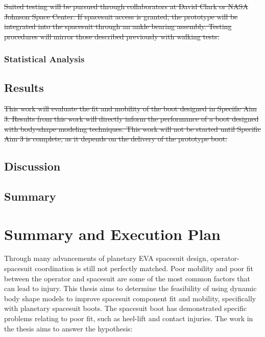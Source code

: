 \documentclass[defaultstyle,11pt]{comps}
\providecommand{\DIFdeltex}[1]{{\protect\color{red}\sout{#1}}}                      %
\providecommand{\DIFaddbegin}{} %
\providecommand{\DIFaddend}{} %
\providecommand{\DIFdelbegin}{} %
\providecommand{\DIFdelend}{} %
\providecommand{\DIFdel}[1]{\texorpdfstring{\DIFdeltex{#1}}{}} %
\newcommand{\DIFscaledelfig}{0.5}
\newlength{\DIFdelgraphicswidth} %
\newlength{\DIFdelgraphicsheight} %
\newcommand{\DIFaddincludegraphics}[2][]{{\color{blue}\fbox{\DIFOincludegraphics[#1]{#2}}}} %
\newcommand{\DIFdelincludegraphics}[2][]{%
\sbox{\DIFdelgraphicsbox}{\DIFOincludegraphics[#1]{#2}}%
\settoboxwidth{\DIFdelgraphicswidth}{\DIFdelgraphicsbox} %
\settoboxtotalheight{\DIFdelgraphicsheight}{\DIFdelgraphicsbox} %
\scalebox{\DIFscaledelfig}{%
\parbox[b]{\DIFdelgraphicswidth}{\usebox{\DIFdelgraphicsbox}\\[-\baselineskip] \rule{\DIFdelgraphicswidth}{0em}}\llap{\resizebox{\DIFdelgraphicswidth}{\DIFdelgraphicsheight}{%
\setlength{\unitlength}{\DIFdelgraphicswidth}%
\begin{picture}(1,1)%
\thicklines\linethickness{2pt} %
{\color[rgb]{1,0,0}\put(0,0){\framebox(1,1){}}}%
{\color[rgb]{1,0,0}\put(0,0){\line( 1,1){1}}}%
{\color[rgb]{1,0,0}\put(0,1){\line(1,-1){1}}}%
\end{picture}%
}\hspace*{3pt}}} %
} %
\DeclareRobustCommand{\DIFaddbegin}{\DIFOaddbegin \let\includegraphics\DIFaddincludegraphics} %
\DeclareRobustCommand{\DIFaddend}{\DIFOaddend \let\includegraphics\DIFOincludegraphics} %
\DeclareRobustCommand{\DIFdelbegin}{\DIFOdelbegin \let\includegraphics\DIFdelincludegraphics} %
\DeclareRobustCommand{\DIFdelend}{\DIFOaddend \let\includegraphics\DIFOincludegraphics} %
\begin{document}
{\DIFdelbegin \DIFdel{Suited testing will be pursued through collaborators at David Clark or NASA Johnson Space Center.
If spacesuit access is granted, the prototype will be integrated into the spacesuit through an ankle bearing assembly.
Testing procedures will mirror those described previously with walking tests.
}\DIFdelend \DIFaddbegin \hypertarget{statistical-analysis}{%
\subsection{Statistical Analysis}\label{statistical-analysis}}
\DIFaddend 

\DIFdelbegin %
\DIFdelend \DIFaddbegin \hypertarget{results-3}{%
\section{Results}\label{results-3}}
\DIFaddend 

\DIFdelbegin \DIFdel{This work will evaluate the fit and mobility of the boot designed in Specific Aim 3.
Results from this work will directly inform the performance of a boot designed with body-shape modeling techniques.
This work will not be started until Specific Aim 3 is complete, as it depends on the delivery of the prototype boot.
}\DIFdelend \DIFaddbegin \hypertarget{discussion}{%
\section{Discussion}\label{discussion}}
\DIFaddend 

\DIFaddbegin \hypertarget{summary-6}{%
\section{Summary}\label{summary-6}}

\DIFaddend \hypertarget{summary-and-execution-plan}{%
\chapter{Summary and Execution Plan}\label{summary-and-execution-plan}}

Through many advancements of planetary EVA spacesuit design, operator-spacesuit coordination is still not perfectly matched.
Poor mobility and poor fit between the operator and spacesuit are some of the most common factors that can lead to injury.
This thesis aims to determine the feasibility of using dynamic body shape models to improve spacesuit component fit and mobility, specifically with planetary spacesuit boots.
The spacesuit boot has demonstrated specific problems relating to poor fit, such as heel-lift and contact injuries.
The work in the thesis aims to answer the hypothesis:

}
\end{document}
